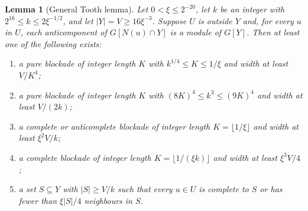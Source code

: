 \documentclass[11pt,a4paper]{article}
\newtheorem{lemma}[theorem]{Lemma}
\theoremstyle{definition}
\theoremstyle{remark}
\numberwithin{equation}{section}
\begin{document}
\begin{lemma}[General Tooth lemma]\label{lem:tooth}
Let \(0<\xi\le\allowbreak 2^{-20}\), let \(k\) be an integer with \(2^{16}\le\allowbreak k\le\allowbreak 2\xi^{-1/2}\), and let \(|Y|=V\ge\allowbreak 16\xi^{-3}\). Suppose \(U\) is outside \(Y\) and, for every \(u\) in \(U\), each anticomponent of \(G[N(u) \cap  Y]\) is a module of \(G[Y]\). Then at least one of the following exists:
\begin{enumerate}[label=TL\arabic*:,leftmargin=3.4em]
\item a pure blockade of integer length \(K\) with \(k^{1/4}\le K\le 1/\xi\) and width at least \(V/K^{4}\);
\item a pure blockade of integer length \(K\) with \((8K)^{4}\le k^{3}\le (9K)^{4}\) and width at least \(V/(2k)\);
\item a complete or anticomplete blockade of integer length \(K=\lfloor 1/\xi\rfloor\) and width at least \(\xi^{2} V/k\);
\item a complete blockade of integer length \(K=\lfloor 1/(\xi k)\rfloor\) and width at least \(\xi^{3} V/4\);
\item a set \(S \subseteq Y\) with \(|S|\ge V/k\) such that every \(u\in U\) is complete to \(S\) or has fewer than \(\xi|S|/4\) neighbours in \(S\).
\end{enumerate}


\end{lemma}
\end{document}
